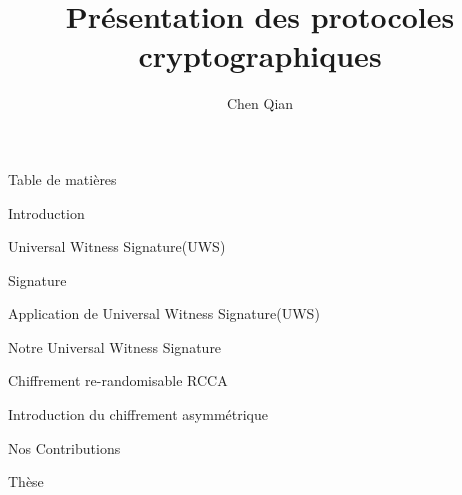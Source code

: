 \documentclass{beamer}
\title{Pr\'esentation des protocoles cryptographiques}
\author{Chen Qian}
\institute{\'ENS de Rennes, France}
\begin{document}

\begin{frame}
  \maketitle
\end{frame}

\begin{frame}{Table de mati\`eres}
  \tableofcontents
\end{frame}

\begin{section}{Introduction}
  
\end{section}

\begin{section}{Universal Witness Signature(UWS)}
  
  \begin{subsection}{Signature}
    
  \end{subsection}

  \begin{subsection}{Application de Universal Witness Signature(UWS)}
    
  \end{subsection}

  \begin{subsection}{Notre Universal Witness Signature}
    
  \end{subsection}

\end{section}

\begin{section}{Chiffrement re-randomisable RCCA}

  \begin{subsection}{Introduction du chiffrement asymm\'etrique}
    
  \end{subsection}
  
  \begin{subsection}{Nos Contributions}
    
  \end{subsection}

\end{section}


\begin{section}{Th\`ese}
  
\end{section}


%    
\end{document}
